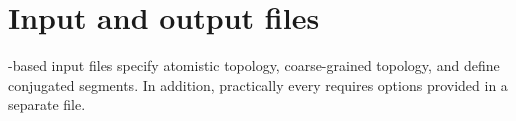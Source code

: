 \chapter{Input and output files}
\label{sec:mapping}

\xml-based input files specify atomistic topology, coarse-grained topology, and define conjugated segments. In addition, practically every \calculator requires options provided in a separate \xml file.






